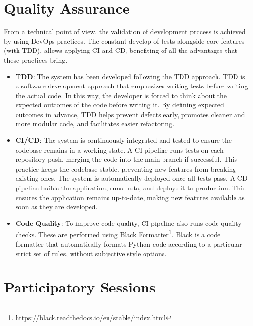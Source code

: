 \documentclass[12pt,a4paper,openright,twoside]{book}
\begin{document}
\section{Quality Assurance}

From a technical point of view, the validation of development process is achieved by using DevOps practices.
%
The constant develop of tests alongside core features (with \ac{TDD}), allows applying \ac{CI} and \acf{CD}, benefiting of all the advantages that these practices bring.

\begin{itemize}[label={}]
    \item \textbf{\acl{TDD}}:
    The system has been developed following the \ac{TDD} approach.
    \ac{TDD} is a software development approach that emphasizes writing tests before writing the actual code.
    In this way, the developer is forced to think about the expected outcomes of the code before writing it.
    By defining expected outcomes in advance, TDD helps prevent defects early, promotes cleaner and more modular code, and facilitates easier refactoring.

    \item \textbf{\ac{CI}/\ac{CD}}:  
    The system is continuously integrated and tested to ensure the codebase remains in a working state.
    A CI pipeline runs tests on each repository push, merging the code into the main branch if successful.
    This practice keeps the codebase stable, preventing new features from breaking existing ones.
    The system is automatically deployed once all tests pass.
    A CD pipeline builds the application, runs tests, and deploys it to production.
    This ensures the application remains up-to-date, making new features available as soon as they are developed.

    \item \textbf{Code Quality}:
    To improve code quality, \ac{CI} pipeline also runs code quality checks.
    These are performed using Black Formatter\footnote{\url{https://black.readthedocs.io/en/stable/index.html}}.
    Black is a code formatter that automatically formats Python code according to a particular strict set of rules, without subjective style options.
\end{itemize}



\section{Participatory Sessions}
\end{document}
